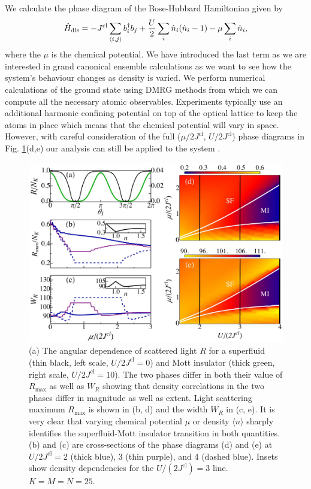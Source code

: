 We calculate the phase diagram of the Bose-Hubbard Hamiltonian given
by
\begin{equation}
    \hat{H}_\mathrm{dis} = -J^\mathrm{cl} \sum_{\langle i, j \rangle}
    b^\dagger_i b_j + \frac{U}{2} \sum_i \hat{n}_i (\hat{n}_i - 1) - \mu
    \sum_i \hat{n}_i,
\end{equation}
where the $\mu$ is the chemical potential. We have introduced the last
term as we are interested in grand canonical ensemble calculations as
we want to see how the system's behaviour changes as density is
varied. We perform numerical calculations of the ground state using
DMRG methods \cite{tnt} from which we can compute all the necessary
atomic observables. Experiments typically use an additional harmonic
confining potential on top of the optical lattice to keep the atoms in
place which means that the chemical potential will vary in
space. However, with careful consideration of the full
($\mu/2J^\text{cl}$, $U/2J^\text{cl}$) phase diagrams in
Fig. \ref{fig:SFMI}(d,e) our analysis can still be applied to the
system \cite{batrouni2002}.

\begin{figure}[htbp!]  
  \centering
  \includegraphics[width=\linewidth]{oph11}
  \caption[Mapping the Bose-Hubbard Phase Diagram]{(a) The angular
    dependence of scattered light $R$ for a superfluid (thin black,
    left scale, $U/2J^\text{cl} = 0$) and Mott insulator (thick green,
    right scale, $U/2J^\text{cl} =10$). The two phases differ in both
    their value of $R_\text{max}$ as well as $W_R$ showing that
    density correlations in the two phases differ in magnitude as well
    as extent. Light scattering maximum $R_\text{max}$ is shown in (b,
    d) and the width $W_R$ in (c, e).  It is very clear that varying
    chemical potential $\mu$ or density $\langle n\rangle$ sharply
    identifies the superfluid-Mott insulator transition in both
    quantities. (b) and (c) are cross-sections of the phase diagrams
    (d) and (e) at $U/2J^\text{cl}=2$ (thick blue), 3 (thin purple),
    and 4 (dashed blue). Insets show density dependencies for the
    $U/(2 J^\text{cl}) = 3$ line. $K=M=N=25$.}
	\label{fig:SFMI}
\end{figure}

